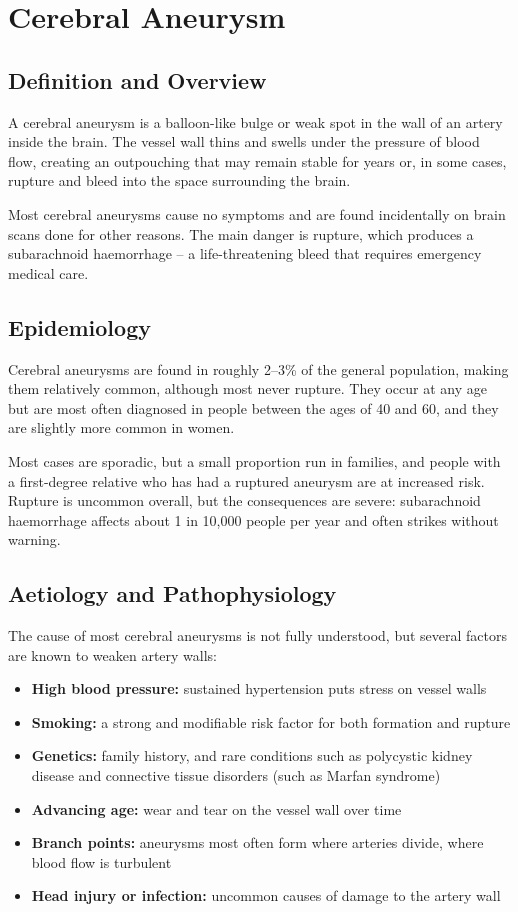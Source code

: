 \chapter{Cerebral Aneurysm}

\section*{Definition and Overview}
A cerebral aneurysm is a balloon-like bulge or weak spot in the wall of an artery inside the brain. The vessel wall thins and swells under the pressure of blood flow, creating an outpouching that may remain stable for years or, in some cases, rupture and bleed into the space surrounding the brain.

Most cerebral aneurysms cause no symptoms and are found incidentally on brain scans done for other reasons. The main danger is rupture, which produces a subarachnoid haemorrhage -- a life-threatening bleed that requires emergency medical care.

\section*{Epidemiology}
Cerebral aneurysms are found in roughly 2--3\% of the general population, making them relatively common, although most never rupture. They occur at any age but are most often diagnosed in people between the ages of 40 and 60, and they are slightly more common in women.

Most cases are sporadic, but a small proportion run in families, and people with a first-degree relative who has had a ruptured aneurysm are at increased risk. Rupture is uncommon overall, but the consequences are severe: subarachnoid haemorrhage affects about 1 in 10,000 people per year and often strikes without warning.

\section*{Aetiology and Pathophysiology}
The cause of most cerebral aneurysms is not fully understood, but several factors are known to weaken artery walls:

\begin{itemize}
    \item \textbf{High blood pressure:} sustained hypertension puts stress on vessel walls
    \item \textbf{Smoking:} a strong and modifiable risk factor for both formation and rupture
    \item \textbf{Genetics:} family history, and rare conditions such as polycystic kidney disease and connective tissue disorders (such as Marfan syndrome)
    \item \textbf{Advancing age:} wear and tear on the vessel wall over time
    \item \textbf{Branch points:} aneurysms most often form where arteries divide, where blood flow is turbulent
    \item \textbf{Head injury or infection:} uncommon causes of damage to the artery wall
\end{itemize}


